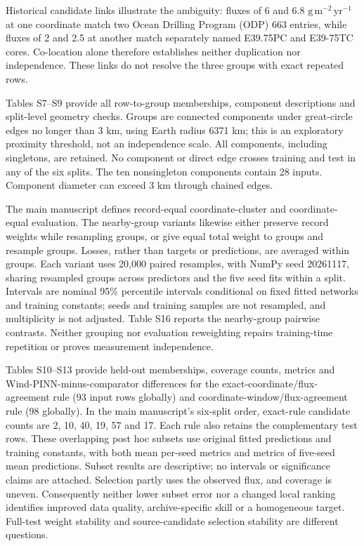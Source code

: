 \documentclass[11pt,a4paper]{article}
\begin{document}
Historical candidate links illustrate the ambiguity: fluxes of 6 and 6.8 $\mathrm{g\,m^{-2}\,yr^{-1}}$ at one coordinate match two Ocean Drilling Program (ODP) 663 entries, while fluxes of 2 and 2.5 at another match separately named E39.75PC and E39-75TC cores. Co-location alone therefore establishes neither duplication nor independence. These links do not resolve the three groups with exact repeated rows.

Tables S7--S9 provide all row-to-group memberships, component descriptions and split-level geometry checks. Groups are connected components under great-circle edges no longer than 3 km, using Earth radius 6371 km; this is an exploratory proximity threshold, not an independence scale. All components, including singletons, are retained. No component or direct edge crosses training and test in any of the six splits. The ten nonsingleton components contain 28 inputs. Component diameter can exceed 3 km through chained edges.

The main manuscript defines record-equal coordinate-cluster and coordinate-equal evaluation. The nearby-group variants likewise either preserve record weights while resampling groups, or give equal total weight to groups and resample groups. Losses, rather than targets or predictions, are averaged within groups. Each variant uses 20,000 paired resamples, with NumPy seed 20261117, sharing resampled groups across predictors and the five seed fits within a split. Intervals are nominal 95\% percentile intervals conditional on fixed fitted networks and training constants; seeds and training samples are not resampled, and multiplicity is not adjusted. Table S16 reports the nearby-group pairwise contrasts. Neither grouping nor evaluation reweighting repairs training-time repetition or proves measurement independence.

Tables S10--S13 provide held-out memberships, coverage counts, metrics and Wind-PINN-minus-comparator differences for the exact-coordinate/flux-agreement rule (93 input rows globally) and coordinate-window/flux-agreement rule (98 globally). In the main manuscript's six-split order, exact-rule candidate counts are 2, 10, 40, 19, 57 and 17. Each rule also retains the complementary test rows. These overlapping post hoc subsets use original fitted predictions and training constants, with both mean per-seed metrics and metrics of five-seed mean predictions. Subset results are descriptive; no intervals or significance claims are attached. Selection partly uses the observed flux, and coverage is uneven. Consequently neither lower subset error nor a changed local ranking identifies improved data quality, archive-specific skill or a homogeneous target. Full-test weight stability and source-candidate selection stability are different questions.
\end{document}
